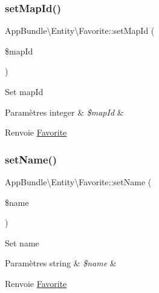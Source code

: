 \subsubsection{\texorpdfstring{set\+Map\+Id()}{setMapId()}}
{\footnotesize\ttfamily App\+Bundle\textbackslash{}\+Entity\textbackslash{}\+Favorite\+::set\+Map\+Id (\begin{DoxyParamCaption}\item[{}]{\$map\+Id }\end{DoxyParamCaption})}

Set map\+Id


\begin{DoxyParams}[1]{Paramètres}
integer & {\em \$map\+Id} & \\
\hline
\end{DoxyParams}
\begin{DoxyReturn}{Renvoie}
\hyperlink{classAppBundle_1_1Entity_1_1Favorite}{Favorite} 
\end{DoxyReturn}
\mbox{\label{classAppBundle_1_1Entity_1_1Favorite_a22180c0120b1661263dc8e3e2053c9cc}} 
\subsubsection{\texorpdfstring{set\+Name()}{setName()}}
{\footnotesize\ttfamily App\+Bundle\textbackslash{}\+Entity\textbackslash{}\+Favorite\+::set\+Name (\begin{DoxyParamCaption}\item[{}]{\$name }\end{DoxyParamCaption})}

Set name


\begin{DoxyParams}[1]{Paramètres}
string & {\em \$name} & \\
\hline
\end{DoxyParams}
\begin{DoxyReturn}{Renvoie}
\hyperlink{classAppBundle_1_1Entity_1_1Favorite}{Favorite} 
\end{DoxyReturn}
\mbox{\label{classAppBundle_1_1Entity_1_1Favorite_ace4e1309956105ce3511efe64ae79287}} 
